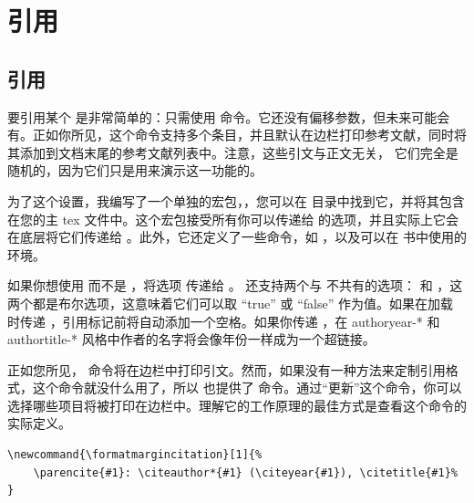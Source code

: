 \setchapterpreamble[u]{\margintoc}
\chapter{引用}

\section{引用}

要引用某个  是非常简单的：只需使用  命令。它还没有偏移参数，但未来可能会有。正如你所见，这个命令支持多个条目，并且默认在边栏打印参考文献，同时将其添加到文档末尾的参考文献列表中。注意，这些引文与正文无关， 它们完全是随机的，因为它们只是用来演示这一功能的。

为了这个设置，我编写了一个单独的宏包，，您可以在  目录中找到它，并将其包含在您的主 tex 文件中。这个宏包接受所有你可以传递给  的选项，并且实际上它会在底层将它们传递给 。此外，它还定义了一些命令，如 ，以及可以在  书中使用的环境。

如果你想使用  而不是 ，将选项  传递给 。 还支持两个与  不共有的选项： 和 ，这两个都是布尔选项，这意味着它们可以取 \enquote{true} 或 \enquote{false} 作为值。如果在加载  时传递 ，引用标记前将自动添加一个空格。如果你传递 ，在 authoryear-* 和 authortitle-* 风格中作者的名字将会像年份一样成为一个超链接。

正如您所见， 命令将在边栏中打印引文。然而，如果没有一种方法来定制引用格式，这个命令就没什么用了，所以  也提供了  命令。通过“更新”这个命令，你可以选择哪些项目将被打印在边栏中。理解它的工作原理的最佳方式是查看这个命令的实际定义。

\begin{lstlisting}[style=kaolstplain]
\newcommand{\formatmargincitation}[1]{%
	\parencite{#1}: \citeauthor*{#1} (\citeyear{#1}), \citetitle{#1}%
}
\end{lstlisting}

